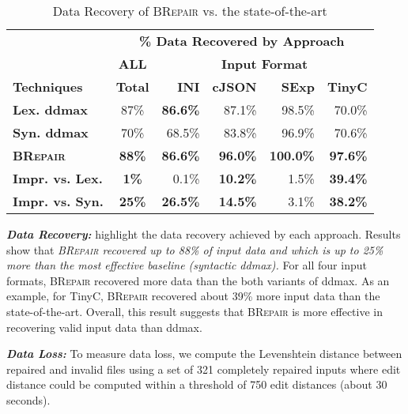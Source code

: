\documentclass[sigconf,review,anonymous]{acmart}
\newcommand{\recheck}[1]{\textcolor{red}{#1}}
\newcommand{\approach}{\textsc{BRepair}\xspace}
\begin{document}
\begin{table}[!tbp]\centering
\caption{Data Recovery of \approach vs. the state-of-the-art}
\begin{tabular}{|l | c | r  r  r  r |}
\hline
&  \multicolumn{5}{c|}{\textbf{\% Data Recovered by Approach}}  \\
&  \multicolumn{1}{c|}{\textbf{ALL}} & \multicolumn{4}{c|}{\textbf{Input Format}}  \\
\textbf{Techniques} & \textbf{Total} & \textbf{INI} & \textbf{cJSON} & \textbf{SExp} & \textbf{TinyC} \\
\hline
\textbf{Lex. ddmax} & 87\% & \textbf{86.6\%} & 87.1\%	 & 98.5\%	& 70.0\% \\			
\textbf{Syn. ddmax} & 70\% & 68.5\% & 83.8\%  & 96.9\%	& 70.6\% \\	
\hline
\textbf{\approach} & \textbf{ 88\%} & \textbf{86.6\%} & \textbf{96.0\%} & \textbf{100.0\%}	& \textbf{97.6\%} \\
\hline
\textbf{Impr. vs. Lex.} & \textbf{1\%} & 0.1\%	& \textbf{10.2\%}	& 1.5\%	& \textbf{39.4\%} \\
\textbf{Impr. vs. Syn.} & \textbf{25\%} & \textbf{26.5\%} 	& \textbf{14.5\%}	& 3.1\%	& \textbf{38.2\% }\\
\hline
\end{tabular}
\label{tab:data-recovery}
\end{table}

\noindent
\textbf{\textit{Data Recovery:}}  %
highlight the data %
recovery achieved by each approach. %
Results show that \textit{\approach recovered up to 88\% of input data and which is up to 25\% more than the most effective baseline (syntactic ddmax).} %
For all four input formats, \approach recovered more data than the both variants of ddmax. As an example, for TinyC, \approach recovered about 39\% more input data than the state-of-the-art.
Overall, this result suggests that \approach is more effective in recovering valid input data than ddmax.

\noindent
\textbf{\textit{Data Loss:}} To measure data loss, we compute the Levenshtein distance between repaired and invalid files using %
a set of 321 completely repaired inputs %
where edit distance could be computed within a threshold of 750 edit distances (about 30 seconds).
\end{document}
